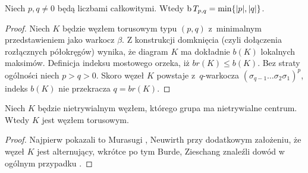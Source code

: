 \begin{corollary}
%
\label{cor:torus_braid_number}%
    Niech $p, q \neq 0$ będą liczbami całkowitymi.
    Wtedy $\operatorname{b} T_{p, q} = \min \{|p|, |q|\}$.
\end{corollary}

\begin{proof}
    Niech $K$ będzie węzłem torusowym typu $(p,q)$ z~minimalnym przedstawieniem jako warkocz $\beta$.
    Z konstrukcji domknięcia (czyli dołączenia rozłącznych półokręgów) wynika,
    że diagram $K$ ma dokładnie $b(K)$ lokalnych maksimów.
    Definicja indeksu mostowego orzeka, iż $br(K) \le b(K)$.
    Bez straty ogólności niech $p > q > 0$.
    Skoro węzeł $K$ powstaje z~$q$-warkocza $(\sigma_{q-1} \ldots \sigma_2\sigma_1)^p$,
    indeks $b(K)$ nie przekracza $q = br(K)$.
\end{proof}

\begin{proposition}
    Niech $K$ będzie nietrywialnym węzłem, którego grupa ma nietrywialne centrum.
    Wtedy $K$ jest węzłem torusowym.
\end{proposition}

\begin{proof}
    Najpierw pokazali to Murasugi \cite{murasugi61}, Neuwirth \cite{neuwirth61} przy dodatkowym założeniu, że węzeł $K$ jest alternujący,
    wkrótce po tym Burde, Zieschang znaleźli dowód w ogólnym przypadku \cite{burde66}.
\end{proof}


